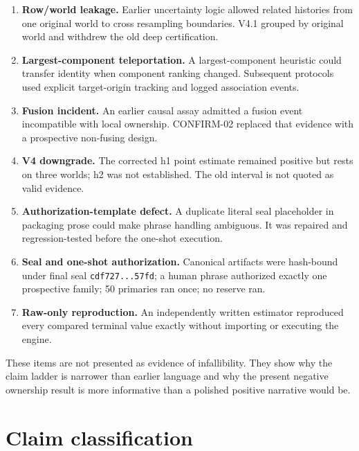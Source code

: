 \documentclass[10pt]{article}
\newcommand{\code}[1]{\texttt{#1}}
\begin{document}
\begin{enumerate}
\item \textbf{Row/world leakage.} Earlier uncertainty logic allowed related histories from one original world to cross resampling boundaries. V4.1 grouped by original world and withdrew the old deep certification.
\item \textbf{Largest-component teleportation.} A largest-component heuristic could transfer identity when component ranking changed. Subsequent protocols used explicit target-origin tracking and logged association events.
\item \textbf{Fusion incident.} An earlier causal assay admitted a fusion event incompatible with local ownership. CONFIRM-02 replaced that evidence with a prospective non-fusing design.
\item \textbf{V4 downgrade.} The corrected h1 point estimate remained positive but rests on three worlds; h2 was not established. The old interval is not quoted as valid evidence.
\item \textbf{Authorization-template defect.} A duplicate literal seal placeholder in packaging prose could make phrase handling ambiguous. It was repaired and regression-tested before the one-shot execution.
\item \textbf{Seal and one-shot authorization.} Canonical artifacts were hash-bound under final seal \code{cdf727...57fd}; a human phrase authorized exactly one prospective family; 50 primaries ran once; no reserve ran.
\item \textbf{Raw-only reproduction.} An independently written estimator reproduced every compared terminal value exactly without importing or executing the engine.
\end{enumerate}

These items are not presented as evidence of infallibility. They show why the claim ladder is narrower than earlier language and why the present negative ownership result is more informative than a polished positive narrative would be.

\section{Claim classification}
\end{document}

